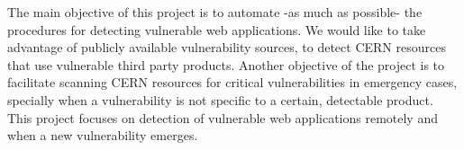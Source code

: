 The main objective of this project is to automate -as much as possible- the procedures for detecting vulnerable web applications. We would like to take advantage of publicly available vulnerability sources, to detect CERN resources that use vulnerable third party products. Another objective of the project is to facilitate scanning CERN resources for critical vulnerabilities in emergency cases, specially when a vulnerability is not specific to a certain, detectable product. This project focuses on detection of vulnerable web applications remotely and when a new vulnerability emerges.

























